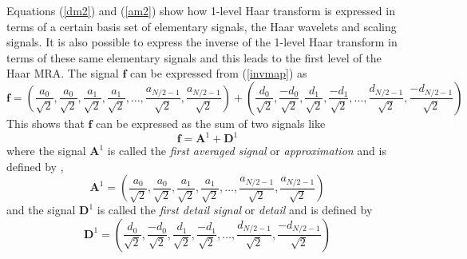 \documentclass[a4paper,11pt]{article}
\begin{document}
Equations (\ref{dm2}) and (\ref{am2}) show how 1-level Haar transform is expressed in terms of a certain basis set of elementary signals, the Haar wavelets and scaling signals. It is also possible to express the inverse of the 1-level Haar transform in terms of these same elementary signals and this leads to the first level of the Haar MRA. The signal $\mathbf{f}$ can be expressed from (\ref{invmap}) as
\begin{displaymath}
\mathbf{f} = \left( \frac{a_{0}}{\sqrt{2}},\frac{a_{0}}{\sqrt{2}},\frac{a_{1}}{\sqrt{2}},\frac{a_{1}}{\sqrt{2}},\ldots,\frac{a_{N/2-1}}{\sqrt{2}},\frac{a_{N/2-1}}{\sqrt{2}} \right) + 
	\left( \frac{d_{0}}{\sqrt{2}},\frac{-d_{0}}{\sqrt{2}},\frac{d_{1}}{\sqrt{2}},\frac{-d_{1}}{\sqrt{2}},\ldots,\frac{d_{N/2-1}}{\sqrt{2}},\frac{-d_{N/2-1}}{\sqrt{2}} \right)
\end{displaymath}
This shows that $\mathbf{f}$ can be expressed as the sum of two signals like 
\begin{equation}
\mathbf{f}=\mathbf{A}^{1}+\mathbf{D}^{1}
\end{equation}
where the signal $\mathbf{A}^{1}$ is called the \emph{first averaged signal} \cite{walker} or \emph{approximation} and is defined by \cite{walker},\cite{nric}
\begin{equation}
\mathbf{A}^{1} = \left( \frac{a_{0}}{\sqrt{2}},\frac{a_{0}}{\sqrt{2}},\frac{a_{1}}{\sqrt{2}},\frac{a_{1}}{\sqrt{2}},\ldots,\frac{a_{N/2-1}}{\sqrt{2}},\frac{a_{N/2-1}}{\sqrt{2}} \right) 
\end{equation}
and the signal $\mathbf{D}^{1}$ is called the \emph{first detail signal} \cite{walker} or \emph{detail} and is defined by
\begin{equation}
\mathbf{D}^{1} = \left( \frac{d_{0}}{\sqrt{2}},\frac{-d_{0}}{\sqrt{2}},\frac{d_{1}}{\sqrt{2}},\frac{-d_{1}}{\sqrt{2}},\ldots,\frac{d_{N/2-1}}{\sqrt{2}},\frac{-d_{N/2-1}}{\sqrt{2}} \right) 
\end{equation}
\end{document}
